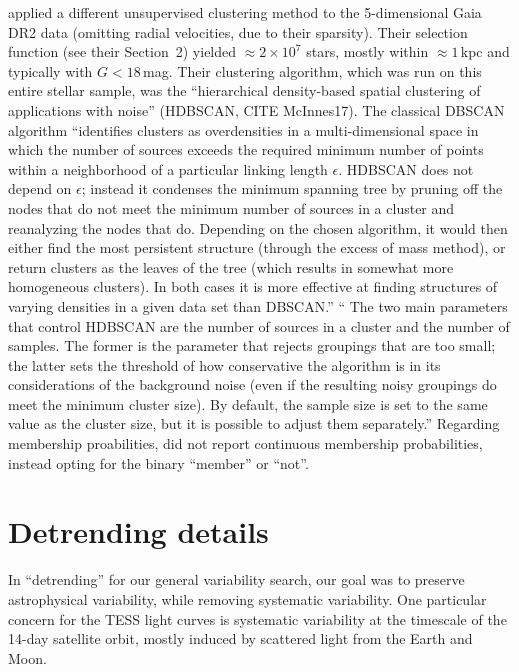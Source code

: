 \documentclass[12pt,twocolumn,tighten]{aastex63}
\begin{document}
applied a different unsupervised
clustering method to the 5-dimensional Gaia DR2 data (omitting radial
velocities, due to their sparsity).  Their selection function (see
their Section~2) yielded $\approx 2\times 10^7$ stars, mostly within
$\approx 1$\,kpc and typically with $G<18$\,mag.  Their clustering
algorithm, which was run on this entire  stellar sample,
 was the ``hierarchical density-based spatial clustering of
applications with noise'' (HDBSCAN, CITE McInnes17).  The classical
DBSCAN algorithm ``identifies clusters as overdensities in a
multi-dimensional space in which the number of sources exceeds the
required minimum number of points within a neighborhood of a
particular linking length $\epsilon$.  HDBSCAN does not depend on
$\epsilon$; instead it condenses the minimum spanning tree by pruning
off the nodes that do not meet the minimum number of sources in a
cluster and reanalyzing the nodes that do. Depending on the chosen
algorithm, it would then either find the most persistent structure
(through the excess of mass method), or return clusters as the leaves
of the tree (which results in somewhat more homogeneous clusters). In
both cases it is more effective at finding structures of varying
densities in a given data set than DBSCAN.''
`` The two main parameters that control HDBSCAN are the number of
sources in a cluster and the number of samples. The former is the
parameter that rejects groupings that are too small; the latter sets
the threshold of how conservative the algorithm is in its
considerations of the background noise (even if the resulting noisy
groupings do meet the minimum cluster size).  By default, the sample
size is set to the same value as the cluster size, but it is possible
to adjust them separately.''
Regarding membership proabilities,
 did not report continuous membership
probabilities, instead opting for the binary ``member'' or ``not''.



\section{Detrending details}
\label{app:detrending}

In ``detrending'' for our general variability search, our goal was to
preserve astrophysical variability, while removing systematic
variability.  One particular concern for the TESS light curves is
systematic variability at the timescale of the 14-day satellite orbit,
mostly induced by scattered light from the Earth and Moon.
\end{document}

